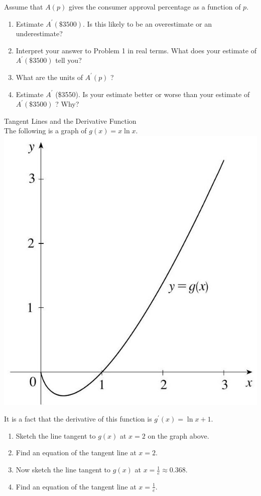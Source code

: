\documentclass[10pt]{article}
\begin{document}
Assume that $A(p)$ gives the consumer approval percentage as a function of $p$.

\begin{enumerate}
  \item Estimate $A^{\prime}(\$ 3500)$. Is this likely to be an overestimate or an underestimate?
  \item Interpret your answer to Problem 1 in real terms. What does your estimate of $A^{\prime}(\$ 3500)$ tell you?
  \item What are the units of $A^{\prime}(p)$ ?
  \item Estimate $A^{\prime}$ (\$3550). Is your estimate better or worse than your estimate of $A^{\prime}(\$ 3500)$ ? Why?
\end{enumerate}

Tangent Lines and the Derivative Function\\
The following is a graph of $g(x)=x \ln x$.\\
\includegraphics[max width=\textwidth, center]{2024_12_26_08a12fb3da5425a27925g-4}

It is a fact that the derivative of this function is $g^{\prime}(x)=\ln x+1$.

\begin{enumerate}
  \item Sketch the line tangent to $g(x)$ at $x=2$ on the graph above.
  \item Find an equation of the tangent line at $x=2$.
  \item Now sketch the line tangent to $g(x)$ at $x=\frac{1}{e} \approx 0.368$.
  \item Find an equation of the tangent line at $x=\frac{1}{e}$.
\end{enumerate}
\end{document}
